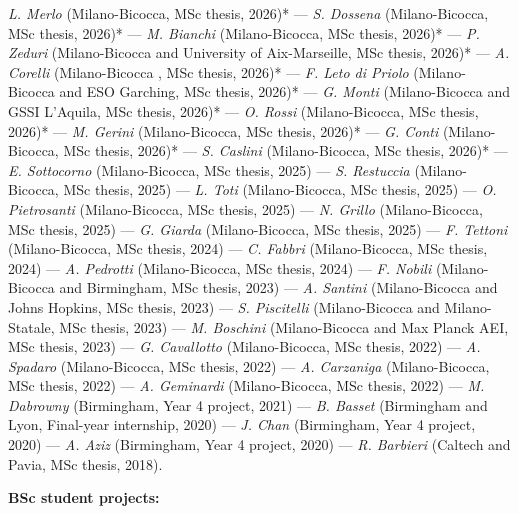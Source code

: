 \textit{L. Merlo} (Milano-Bicocca, MSc thesis, 2026)* --- 
\textit{S. Dossena} (Milano-Bicocca, MSc thesis, 2026)* --- 
\textit{M. Bianchi} (Milano-Bicocca, MSc thesis, 2026)* --- 
\textit{P. Zeduri} (Milano-Bicocca and University of Aix-Marseille, MSc thesis, 2026)* --- 
\textit{A. Corelli} (Milano-Bicocca , MSc thesis, 2026)* --- 
\textit{F. Leto di Priolo} (Milano-Bicocca and ESO Garching, MSc thesis, 2026)* --- 
\textit{G. Monti} (Milano-Bicocca and GSSI L'Aquila, MSc thesis, 2026)* --- 
\textit{O. Rossi} (Milano-Bicocca, MSc thesis, 2026)* --- 
\textit{M. Gerini} (Milano-Bicocca, MSc thesis, 2026)* --- 
\textit{G. Conti} (Milano-Bicocca, MSc thesis, 2026)* --- 
\textit{S. Caslini} (Milano-Bicocca, MSc thesis, 2026)* --- 
\textit{E. Sottocorno} (Milano-Bicocca, MSc thesis, 2025) --- 
\textit{S. Restuccia} (Milano-Bicocca, MSc thesis, 2025) --- 
\textit{L. Toti} (Milano-Bicocca, MSc thesis, 2025) --- 
\textit{O. Pietrosanti} (Milano-Bicocca, MSc thesis, 2025) --- 
\textit{N. Grillo} (Milano-Bicocca, MSc thesis, 2025) --- 
\textit{G. Giarda} (Milano-Bicocca, MSc thesis, 2025) --- 
\textit{F. Tettoni} (Milano-Bicocca, MSc thesis, 2024) --- 
\textit{C. Fabbri} (Milano-Bicocca, MSc thesis, 2024) --- 
\textit{A. Pedrotti} (Milano-Bicocca, MSc thesis, 2024) --- 
\textit{F. Nobili} (Milano-Bicocca and Birmingham, MSc thesis, 2023) --- 
\textit{A. Santini} (Milano-Bicocca and Johns Hopkins, MSc thesis, 2023) --- 
\textit{S. Piscitelli} (Milano-Bicocca and Milano-Statale, MSc thesis, 2023) --- 
\textit{M. Boschini} (Milano-Bicocca and Max Planck AEI, MSc thesis, 2023) --- 
\textit{G. Cavallotto} (Milano-Bicocca, MSc thesis, 2022) --- 
\textit{A. Spadaro} (Milano-Bicocca, MSc thesis, 2022) --- 
\textit{A. Carzaniga} (Milano-Bicocca, MSc thesis, 2022) --- 
\textit{A. Geminardi} (Milano-Bicocca, MSc thesis, 2022) --- 
\textit{M. Dabrowny} (Birmingham, Year 4 project, 2021) --- 
\textit{B. Basset} (Birmingham and Lyon, Final-year internship, 2020) --- 
\textit{J. Chan} (Birmingham, Year 4 project, 2020) --- 
\textit{A. Aziz} (Birmingham, Year 4 project, 2020) --- 
\textit{R. Barbieri} (Caltech and Pavia, MSc thesis, 2018).

\vspace{0.2cm}
\textbf{BSc student projects:}

